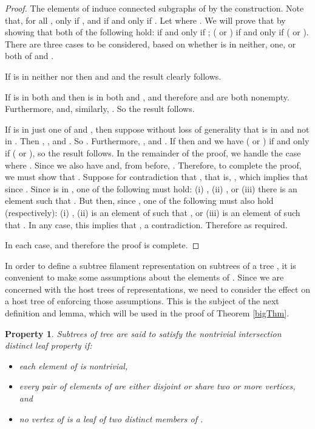 \documentclass[
final
]{dmtcs-episciences}        \usepackage{graphics, amsthm, amsmath, amssymb, algorithm, algorithmic}
\newtheorem{property}{Property}
\begin{document}
\begin{proof}
The elements of  induce connected subgraphs of  by the construction.
Note that, for all , 
 only if , and
 if and only if .
Let  where .
We will prove that  by showing that
both of the following hold:
 if and only if ;  ( or ) if and only if ( or ). There are three cases to be considered, based on whether  is in neither, one, or both of  and .

If  is in neither  nor  then  and  and the result clearly follows.

If  is in both  and  then  is in both  and , and therefore  and  are both nonempty.
Furthermore,  and, similarly, . So the result follows.

If  is in just one of  and , 
then suppose without loss of generality that  is in  and not in . 
Then , , and . 
So 
.
Furthermore,
,
and .
If  then  and we have 
( or ) if and only if ( or ),
so the result follows.
In the remainder of the proof, we handle the case where .
Since  we also have  and, from before, .
Therefore, to complete the proof, we must show that .
Suppose for contradiction that , that is, , which implies that  since .
Since  is in , one of the following must hold: 
(i) ,
(ii) , 
or 
(iii) there is an element  such that .
But then, since , one of the following must also hold (respectively):
(i) , 
(ii)  is an element of  such that , 
or
(iii)  is an element of  such that .
In any case, this implies that , a contradiction.
Therefore  as required.

In each case,  and therefore the proof is complete.
\end{proof}

In order to define a subtree filament representation on subtrees  of a tree , it is convenient to make some assumptions about the elements of . Since we are concerned with the host trees of representations, we need to consider the effect on a host tree of enforcing those assumptions. This is the subject of the next definition and lemma, which will be used in the proof of Theorem \ref{bigThm}.

\begin{property}\label{A}
Subtrees
 of tree  are said to satisfy the {\em nontrivial intersection distinct leaf property} if:
\begin{itemize}
\item
each element of  is nontrivial, 
\item
every pair of elements of  are either disjoint or share two or more vertices, and 
\item
no vertex of  is a leaf of two distinct members of .
\end{itemize}
\end{property}
\end{document}
